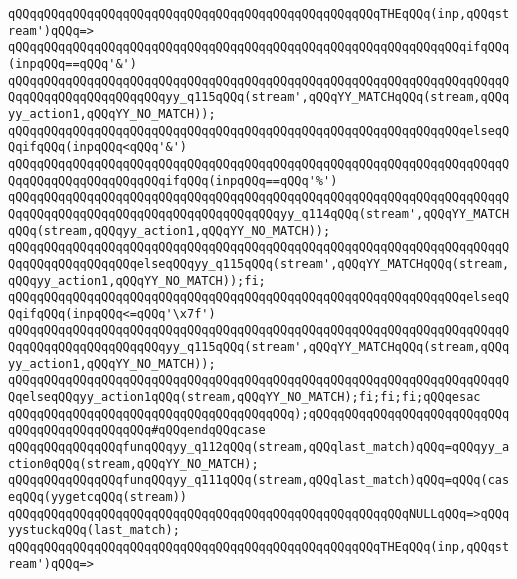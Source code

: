 \verb|qQQqqQQqqQQqqQQqqQQqqQQqqQQqqQQqqQQqqQQqqQQqqQQqqQQqTHEqQQq(inp,qQQqstream')qQQq=>|\newline
\verb|qQQqqQQqqQQqqQQqqQQqqQQqqQQqqQQqqQQqqQQqqQQqqQQqqQQqqQQqqQQqqQQqifqQQq(inpqQQq==qQQq'&')|\newline
\verb|qQQqqQQqqQQqqQQqqQQqqQQqqQQqqQQqqQQqqQQqqQQqqQQqqQQqqQQqqQQqqQQqqQQqqQQqqQQqqQQqqQQqqQQqqQQqyy_q115qQQq(stream',qQQqYY_MATCHqQQq(stream,qQQqyy_action1,qQQqYY_NO_MATCH));|\newline
\verb|qQQqqQQqqQQqqQQqqQQqqQQqqQQqqQQqqQQqqQQqqQQqqQQqqQQqqQQqqQQqqQQqelseqQQqifqQQq(inpqQQq<qQQq'&')|\newline
\verb|qQQqqQQqqQQqqQQqqQQqqQQqqQQqqQQqqQQqqQQqqQQqqQQqqQQqqQQqqQQqqQQqqQQqqQQqqQQqqQQqqQQqqQQqqQQqifqQQq(inpqQQq==qQQq'%')|\newline
\verb|qQQqqQQqqQQqqQQqqQQqqQQqqQQqqQQqqQQqqQQqqQQqqQQqqQQqqQQqqQQqqQQqqQQqqQQqqQQqqQQqqQQqqQQqqQQqqQQqqQQqqQQqqQQqyy_q114qQQq(stream',qQQqYY_MATCHqQQq(stream,qQQqyy_action1,qQQqYY_NO_MATCH));|\newline
\verb|qQQqqQQqqQQqqQQqqQQqqQQqqQQqqQQqqQQqqQQqqQQqqQQqqQQqqQQqqQQqqQQqqQQqqQQqqQQqqQQqqQQqqQQqelseqQQqyy_q115qQQq(stream',qQQqYY_MATCHqQQq(stream,qQQqyy_action1,qQQqYY_NO_MATCH));fi;|\newline
\verb|qQQqqQQqqQQqqQQqqQQqqQQqqQQqqQQqqQQqqQQqqQQqqQQqqQQqqQQqqQQqqQQqelseqQQqifqQQq(inpqQQq<=qQQq'\x7f')|\newline
\verb|qQQqqQQqqQQqqQQqqQQqqQQqqQQqqQQqqQQqqQQqqQQqqQQqqQQqqQQqqQQqqQQqqQQqqQQqqQQqqQQqqQQqqQQqqQQqyy_q115qQQq(stream',qQQqYY_MATCHqQQq(stream,qQQqyy_action1,qQQqYY_NO_MATCH));|\newline
\verb|qQQqqQQqqQQqqQQqqQQqqQQqqQQqqQQqqQQqqQQqqQQqqQQqqQQqqQQqqQQqqQQqqQQqqQQqelseqQQqyy_action1qQQq(stream,qQQqYY_NO_MATCH);fi;fi;fi;qQQqesac|\newline
\verb|qQQqqQQqqQQqqQQqqQQqqQQqqQQqqQQqqQQqqQQq);qQQqqQQqqQQqqQQqqQQqqQQqqQQqqQQqqQQqqQQqqQQqqQQq#qQQqendqQQqcase|\newline
\verb|qQQqqQQqqQQqqQQqfunqQQqyy_q112qQQq(stream,qQQqlast_match)qQQq=qQQqyy_action0qQQq(stream,qQQqYY_NO_MATCH);|\newline
\verb|qQQqqQQqqQQqqQQqfunqQQqyy_q111qQQq(stream,qQQqlast_match)qQQq=qQQq(caseqQQq(yygetcqQQq(stream))|\newline
\verb|qQQqqQQqqQQqqQQqqQQqqQQqqQQqqQQqqQQqqQQqqQQqqQQqqQQqqQQqNULLqQQq=>qQQqyystuckqQQq(last_match);|\newline
\verb|qQQqqQQqqQQqqQQqqQQqqQQqqQQqqQQqqQQqqQQqqQQqqQQqqQQqTHEqQQq(inp,qQQqstream')qQQq=>|\newline
